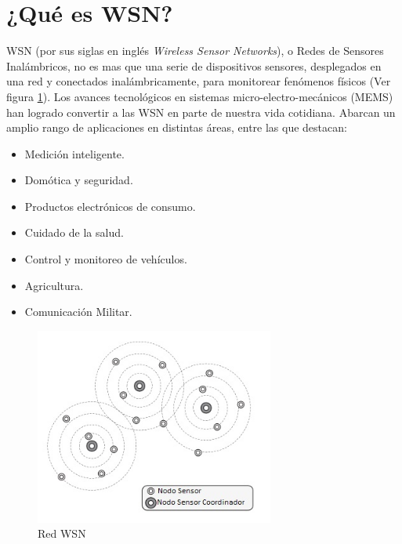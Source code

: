 \section{¿Qué es WSN?}
\label{sec:wsn}

WSN (por sus siglas en inglés \textit{Wireless Sensor Networks}), o Redes de Sensores Inalámbricos, no es mas que una serie de dispositivos sensores, desplegados en una red y conectados inalámbricamente, para monitorear fenómenos físicos (Ver figura \ref{fig:wsn}). Los avances tecnológicos en sistemas micro-electro-mecánicos (MEMS) han logrado convertir a las WSN en parte de nuestra vida cotidiana. Abarcan un amplio rango de aplicaciones en distintas áreas, entre las que destacan:
		\begin{itemize}
			\item Medición inteligente.
			\item Domótica y seguridad.
			\item Productos electrónicos de consumo.
			\item Cuidado de la salud.
			\item Control y monitoreo de vehículos.
			\item Agricultura.
			\item Comunicación Militar.
		\end{itemize}

\vspace{10px}
		
\begin{figure}[h!]
	\centering
    \includegraphics[width=0.7\textwidth]{./Figures/WSN.jpg}
    	\caption{Red WSN}
	\label{fig:wsn}
\end{figure}
		
